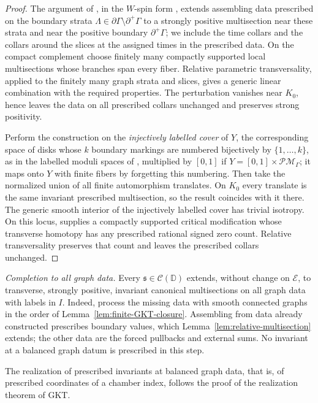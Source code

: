 \begin{proof}
The argument of \cite[Lem.~6.5]{buryaketal2024}, in the $W$-spin form
\cite[Lem.~5.15]{grossetal2022open}, extends assembling data prescribed on
the boundary strata $\Lambda\in\partial\Gamma\setminus\partial^+\Gamma$
to a strongly positive multisection near these strata and near the positive
boundary $\partial^+\Gamma$; we include the time collars and the collars
around the slices at the assigned times in the prescribed data.  On the
compact complement choose finitely many compactly supported local
multisections whose branches span every fiber.  Relative parametric
transversality, applied to the finitely many graph strata and slices, gives
a generic linear combination with the required properties.  The
perturbation vanishes near $K_0$, hence leaves the data on all prescribed
collars unchanged and preserves strong positivity.

Perform the construction on the \emph{injectively labelled cover} of $Y$,
the corresponding space of disks whose $k$ boundary markings are numbered
bijectively by $\{1,\dots,k\}$, as in the labelled moduli spaces of
\cite[Def.~2.2]{grossetal2022open}, multiplied by $[0,1]$ if
$Y=[0,1]\times\mathcal{PM}_\Gamma$; it maps onto $Y$ with finite fibers by
forgetting this numbering.  Then take the normalized union of all finite
automorphism translates.  On $K_0$ every
translate is the same invariant prescribed multisection, so the result
coincides with it there.  The generic smooth interior of the injectively
labelled cover has trivial isotropy.  On this locus,
\cite[Lem.~5.17]{grossetal2022open} supplies a compactly supported critical
modification whose transverse homotopy has any prescribed rational signed
zero count.  Relative transversality preserves that count and leaves the
prescribed collars unchanged.
\end{proof}

\emph{Completion to all graph data.}  Every $\mathfrak s\in\mathcal
C(\mathbb D)$ extends, without change on $\mathcal E$, to transverse,
strongly positive, invariant canonical multisections on all graph data with
labels in $I$.  Indeed, process the missing data with smooth connected graphs
in the order of Lemma~\ref{lem:finite-GKT-closure}.  Assembling from data already
constructed prescribes boundary values, which
Lemma~\ref{lem:relative-multisection} extends; the other data are the forced
pullbacks and external sums.  No invariant at a balanced graph datum is
prescribed in this step.

The realization of prescribed invariants at balanced graph data, that is, of
prescribed coordinates of a chamber index, follows the proof of the
realization theorem of GKT.

